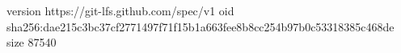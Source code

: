 version https://git-lfs.github.com/spec/v1
oid sha256:dae215c3bc37cf2771497f71f15b1a663fee8b8cc254b97b0c53318385c468de
size 87540

